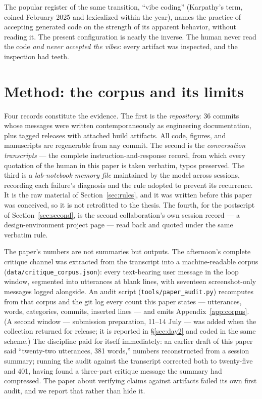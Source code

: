 \documentclass[11pt]{article}
\begin{document}
The popular register of the same transition, ``vibe coding'' (Karpathy's term, coined February 2025 and lexicalized within the year), names the practice of accepting generated code on the strength of its apparent behavior, without reading it. The present configuration is nearly the inverse. The human never read the code \emph{and never accepted the vibes}: every artifact was inspected, and the inspection had teeth.

\section{Method: the corpus and its limits}\label{sec:method}

Four records constitute the evidence. The first is the \emph{repository}: 36 commits whose messages were written contemporaneously as engineering documentation, plus tagged releases with attached build artifacts. All code, figures, and manuscripts are regenerable from any commit. The second is the \emph{conversation transcripts} — the complete instruction-and-response record, from which every quotation of the human in this paper is taken verbatim, typos preserved. The third is a \emph{lab-notebook memory file} maintained by the model across sessions, recording each failure's diagnosis and the rule adopted to prevent its recurrence. It is the raw material of Section~\ref{sec:rules}, and it was written before this paper was conceived, so it is not retrofitted to the thesis. The fourth, for the postscript of Section~\ref{sec:second}, is the second collaboration's own session record — a design-environment project page — read back and quoted under the same verbatim rule.

The paper's numbers are not summaries but outputs. The afternoon's complete critique channel was extracted from the transcript into a machine-readable corpus (\texttt{data/critique\_corpus.json}): every text-bearing user message in the loop window, segmented into utterances at blank lines, with seventeen screenshot-only messages logged alongside. An audit script (\texttt{tools/paper\_audit.py}) recomputes from that corpus and the git log every count this paper states — utterances, words, categories, commits, inserted lines — and emits Appendix~\ref{app:corpus}. (A second window — submission preparation, 11--14 July — was added when the collection returned for release; it is reported in \S\ref{sec:day2} and coded in the same scheme.) The discipline paid for itself immediately: an earlier draft of this paper said ``twenty-two utterances, 381 words,'' numbers reconstructed from a session summary; running the audit against the transcript corrected both to twenty-five and 401, having found a three-part critique message the summary had compressed. The paper about verifying claims against artifacts failed its own first audit, and we report that rather than hide it.
\end{document}
